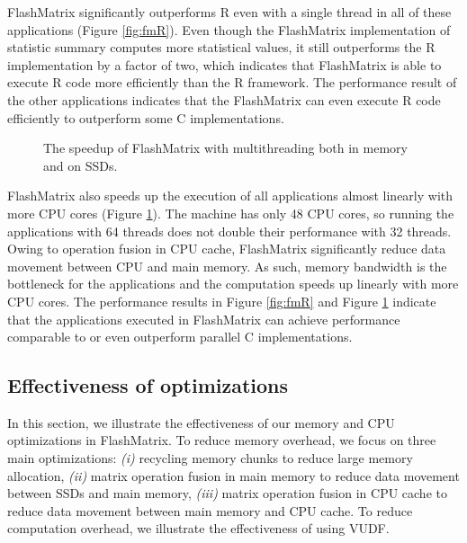 FlashMatrix significantly outperforms R even with a single thread in all of these
applications (Figure \ref{fig:fmR}). Even though the FlashMatrix implementation
of statistic summary computes more statistical values, it still outperforms
the R implementation by a factor of two, which indicates that FlashMatrix is
able to execute R code more efficiently than the R framework. The performance
result of the other applications indicates that the FlashMatrix can even
execute R code efficiently to outperform some C implementations.

\begin{figure}
	\begin{center}
		\footnotesize
		
		\caption{The speedup of FlashMatrix with multithreading both in memory
		and on SSDs.}
		\label{fig:speedup}
	\end{center}
\end{figure}

FlashMatrix also speeds up the execution of all applications almost linearly
with more CPU cores (Figure \ref{fig:speedup}). The machine has only 48 CPU
cores, so running the applications with 64 threads does not double their
performance with 32 threads. Owing to operation fusion in CPU cache,
FlashMatrix significantly reduce data movement between CPU and main memory.
As such, memory bandwidth is the bottleneck for the applications and
the computation speeds up linearly with
more CPU cores. The performance results in Figure \ref{fig:fmR} and Figure
\ref{fig:speedup} indicate that the applications executed in FlashMatrix can
achieve performance comparable to or even outperform parallel C implementations.

\subsection{Effectiveness of optimizations}

In this section, we illustrate the effectiveness of our memory and CPU
optimizations in FlashMatrix. To reduce memory overhead, we focus on three
main optimizations: \textit{(i)} recycling memory chunks to reduce large
memory allocation, \textit{(ii)} matrix operation fusion in main
memory to reduce data movement between SSDs and main memory, \textit{(iii)}
matrix operation fusion in CPU cache to reduce data movement between main
memory and CPU cache. To reduce computation overhead, we illustrate
the effectiveness of using VUDF.

